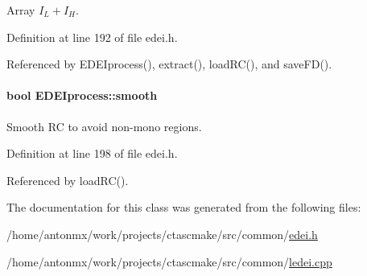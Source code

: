 Array $ I_L+I_H $. 



Definition at line 192 of file edei.h.



Referenced by EDEIprocess(), extract(), loadRC(), and saveFD().

\hypertarget{classEDEIprocess_aba287078b716c76c2d2276cec54a4bd3}{
\paragraph[{smooth}]{\setlength{\rightskip}{0pt plus 5cm}bool {\bf EDEIprocess::smooth}}\hfill}
\label{classEDEIprocess_aba287078b716c76c2d2276cec54a4bd3}


Smooth RC to avoid non-\/mono regions. 



Definition at line 198 of file edei.h.



Referenced by loadRC().



The documentation for this class was generated from the following files:\begin{DoxyCompactItemize}
\item 
/home/antonmx/work/projects/ctascmake/src/common/\hyperlink{edei_8h}{edei.h}\item 
/home/antonmx/work/projects/ctascmake/src/common/\hyperlink{ledei_8cpp}{ledei.cpp}\end{DoxyCompactItemize}
